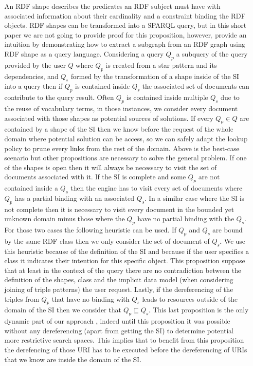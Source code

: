 An RDF shape describes the predicates an RDF subject must have with associated information about
their cardinality and a constraint binding the RDF objects.
RDF shapes can be transformed into a SPARQL query, but
in this short paper we are not going to provide proof for this proposition, however,
\citeauthor{Delva2021} provide an intuition by demonstrating how to extract 
a subgraph from an RDF graph using RDF shape as a query language.
Considering a query $Q_p$ a subquery of the query provided by the user $Q$
where $Q_p$ is created from a star pattern and its dependencies, and $Q_s$ formed by the transformation of a shape inside of the SI
into a query then if  $Q_p$ is contained inside $Q_s$ the associated 
set of documents can contribute to the query result.
Often $Q_p$ is contained inside multiple $Q_s$ due to the reuse of vocabulary terms,
in those instances, we consider every document associated with those shapes
as potential sources of solutions.
If every $Q_p \in Q$ are contained by a shape of the SI then we know before the request of the whole domain
where potential solution can be access, so we can safely adapt the lookup policy to prune every links from the rest of the domain.
Above is the best-case scenario but other propositions are necessary to solve the general problem.
If one of the shapes is open then it will always be necessary to visit the set of documents associated
with it. If the SI is complete and some $Q_p$ are not contained inside a $Q_s$ then the engine has to visit
every set of documents where $Q_p$ has a partial binding with an associated $Q_s$.
In a similar case where the SI is not complete then it is necessary to visit every document in the bounded yet unknown domain minus those
where the $Q_p$ have no partial binding with the $Q_s$.
For those two cases the following heuristic can be used.
If $Q_p$ and $Q_s$ are bound by the same RDF class then we only consider the set of document of $Q_s$.
We use this heuristic because of the definition of the SI and because if the user specifies a class it indicates their intention for this specific object.
This proposition suppose that at least in the context of the query there are no contradiction between the
definition of the shapes, class and the implicit data model (when considering joining of triple patterns) the user request. 
Lastly, if the dereferencing of the triples from $Q_p$ that have no binding with $Q_s$
leads to resources outside of the domain of the SI then we consider that $Q_p  \sqsubseteq Q_s$.
This last proposition is the only dynamic part of our approach , indeed until this
proposition it was possible without any dereferencing (apart from getting the SI) to determine potential more restrictive search spaces.
This implies that to benefit from this proposition the derefencing of those URI has to be executed
before the dereferencing of URIs that we know are inside the domain of the SI.
